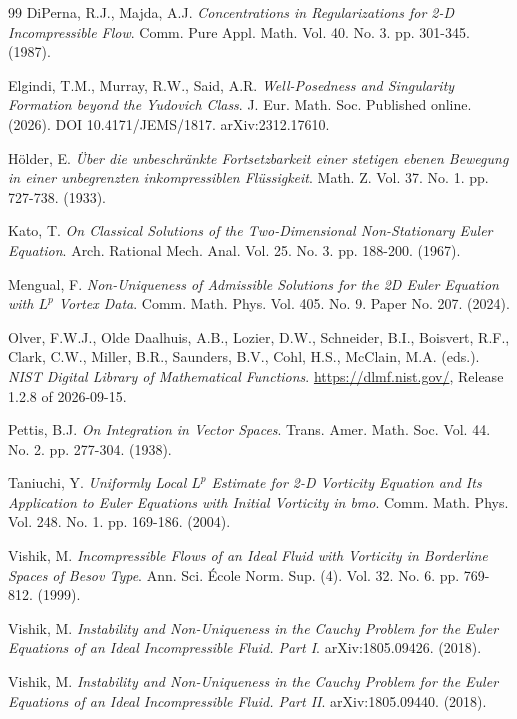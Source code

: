 \begin{thebibliography}{99}
DiPerna, R.J., Majda, A.J.
\textit{Concentrations in Regularizations for 2-D Incompressible Flow}.
Comm. Pure Appl. Math. Vol. 40. No. 3. pp. 301-345. (1987).

Elgindi, T.M., Murray, R.W., Said, A.R.
\textit{Well-Posedness and Singularity Formation beyond the Yudovich Class}.
J. Eur. Math. Soc. Published online. (2026). DOI 10.4171/JEMS/1817.
arXiv:2312.17610.

H\"older, E.
\textit{\"Uber die unbeschr\"ankte Fortsetzbarkeit einer stetigen ebenen Bewegung in
einer unbegrenzten inkompressiblen Fl\"ussigkeit}.
Math. Z. Vol. 37. No. 1. pp. 727-738. (1933).

Kato, T.
\textit{On Classical Solutions of the Two-Dimensional Non-Stationary Euler Equation}.
Arch. Rational Mech. Anal. Vol. 25. No. 3. pp. 188-200. (1967).

Mengual, F.
\textit{Non-Uniqueness of Admissible Solutions for the 2D Euler Equation with $L^p$
Vortex Data}.
Comm. Math. Phys. Vol. 405. No. 9. Paper No. 207. (2024).

Olver, F.W.J., Olde Daalhuis, A.B., Lozier, D.W., Schneider, B.I., Boisvert, R.F.,
Clark, C.W., Miller, B.R., Saunders, B.V., Cohl, H.S., McClain, M.A. (eds.).
\textit{NIST Digital Library of Mathematical Functions}.
\url{https://dlmf.nist.gov/}, Release 1.2.8 of 2026-09-15.

Pettis, B.J.
\textit{On Integration in Vector Spaces}.
Trans. Amer. Math. Soc. Vol. 44. No. 2. pp. 277-304. (1938).

Taniuchi, Y.
\textit{Uniformly Local $L^p$ Estimate for 2-D Vorticity Equation and Its
Application to Euler Equations with Initial Vorticity in bmo}.
Comm. Math. Phys. Vol. 248. No. 1. pp. 169-186. (2004).

Vishik, M.
\textit{Incompressible Flows of an Ideal Fluid with Vorticity in Borderline Spaces
of Besov Type}.
Ann. Sci. \'Ecole Norm. Sup. (4). Vol. 32. No. 6. pp. 769-812. (1999).

Vishik, M.
\textit{Instability and Non-Uniqueness in the Cauchy Problem for the Euler Equations
of an Ideal Incompressible Fluid. Part I}.
arXiv:1805.09426. (2018).

Vishik, M.
\textit{Instability and Non-Uniqueness in the Cauchy Problem for the Euler Equations
of an Ideal Incompressible Fluid. Part II}.
arXiv:1805.09440. (2018).


\end{thebibliography}
